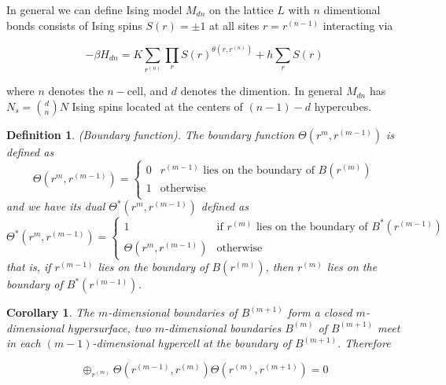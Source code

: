 \documentclass[11pt]{article}
\newtheorem{definition}{Definition}
\newtheorem{corollary}{Corollary}
\begin{document}
In general we can define Ising model $M_{dn}$ on the lattice $L$ with $n$ dimentional bonds consists
of Ising spins $S(r) = \pm 1$ at all sites $r = r^{(n-1)}$ interacting via

\begin{equation}
    -\beta H_{dn} = K\sum_{r^{(n)}} \prod_{r} S(r)^{\theta(r, r^{(n)})} + h\sum_{r} S(r)
\end{equation}

where $n$ denotes the $n-\text{cell}$, and $d$ denotes the dimention. In general $M_{dn}$ has
$N_s = \binom{d}{n}N$ Ising spins located at the centers of $(n-1)-d$ hypercubes.

\begin{definition}
    (Boundary function). The boundary function $\Theta(r^{m}, r^{(m-1)})$ is defined as
    \begin{equation}
        \Theta(r^{m}, r^{(m-1)}) = \begin{cases}
            0 & \text{$r^{(m-1)}$ lies on the boundary of $B(r^{(m)})$}\\
            1 & \text{otherwise}\\
        \end{cases}
    \end{equation} and we have its dual $\Theta^{*}(r^{m}, r^{(m-1)})$ defined as
    \begin{equation}
        \Theta^{*}(r^{m}, r^{(m-1)}) = \begin{cases}
            1 & \text{if $r^{(m)}$ lies on the boundary of $B^{*}(r^{(m-1)})$}\\
            \Theta(r^{m}, r^{(m-1)}) & \text{otherwise}
        \end{cases}
    \end{equation}
    that is, if $r^{(m-1)}$ lies on the boundary of $B(r^{(m)})$, then $r^{(m)}$ lies
    on the boundary of $B^{*}(r^{(m-1)})$.
\end{definition}

\begin{corollary}
    The $m$-dimensional boundaries of $B^{(m+1)}$ form a closed $m$-dimensional hypersurface,
    two $m$-dimensional boundaries $B^{(m)}$ of $B^{(m+1)}$ meet in each $(m-1)$-dimensional
    hypercell at the boundary of $B^{(m+1)}$. Therefore

    \begin{equation}
        \oplus_{r^{(m)}} \Theta(r^{(m-1)}, r^{(m)})\Theta(r^{(m)}, r^{(m+1)}) = 0
    \end{equation}
\end{corollary}
\end{document}
